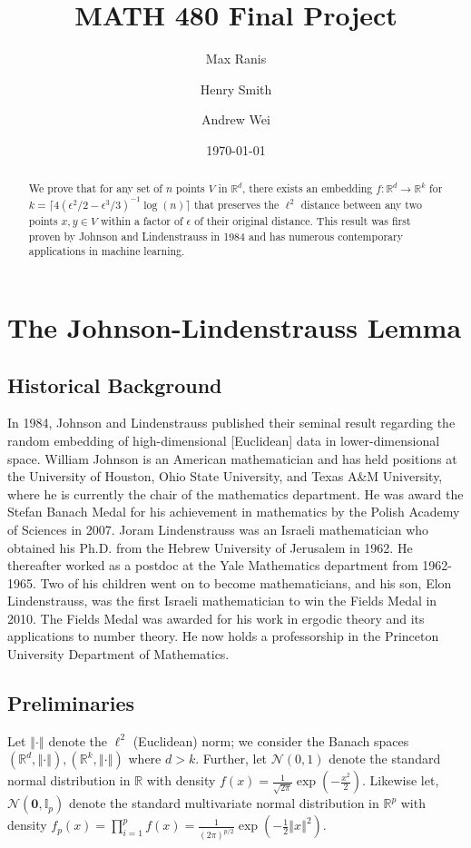 \documentclass{article}
\title{MATH 480 Final Project}
\author[]{Max Ranis}
\author[]{Henry Smith}
\author[]{Andrew Wei}
\affil[]{\normalsize Yale University}
\date{\today}
\begin{document}
\maketitle

\begin{abstract}
    \noindent We prove that for any set of $n$ points $V$ in $\mathbb{R}^d$, there exists an embedding $f: \mathbb{R}^d \rightarrow \mathbb{R}^k$ for $k = \lceil 4(\epsilon^2/2 - \epsilon^3/3)^{-1} \log(n) \rceil$ that preserves the $\ell^2$ distance between any two points $x, y \in V$ within a factor of $\epsilon$ of their original distance. This result was first proven by Johnson and Lindenstrauss in 1984 and has numerous contemporary applications in machine learning.
\end{abstract}


\pagebreak

\section{The Johnson-Lindenstrauss Lemma}

\subsection{Historical Background}
In 1984, Johnson and Lindenstrauss published their seminal result regarding the random embedding of high-dimensional [Euclidean] data in lower-dimensional space. William Johnson is an American mathematician and has held positions at the University of Houston, Ohio State University, and Texas A\&M University, where he is currently the chair of the mathematics department. He was award the Stefan Banach Medal for his achievement in mathematics by the Polish Academy of Sciences in 2007. Joram Lindenstrauss was an Israeli mathematician who obtained his Ph.D. from the Hebrew University of Jerusalem in 1962. He thereafter worked as a postdoc at the Yale Mathematics department from 1962-1965. Two of his children went on to become mathematicians, and his son, Elon Lindenstrauss, was the first Israeli mathematician to win the Fields Medal in 2010. The Fields Medal was awarded for his work in ergodic theory and its applications to number theory. He now holds a professorship in the Princeton University Department of Mathematics.

\subsection{Preliminaries}
Let $\left\Vert \cdot \right\Vert$ denote the $\ell^2$ (Euclidean) norm; we consider the Banach spaces $(\mathbb{R}^d, \left\Vert \cdot \right\Vert), (\mathbb{R}^k, \left\Vert \cdot \right\Vert)$ where $d > k$. Further, let $\mathcal{N}(0, 1)$ denote the standard normal distribution in $\mathbb{R}$ with density $f(x) = \frac{1}{\sqrt{2 \pi}} \exp \left(-\frac{x^2}{2} \right)$. Likewise let, $\mathcal{N}(\boldsymbol{0}, \mathbb{I}_p)$ denote the standard multivariate normal distribution in $\mathbb{R}^p$ with density $f_p(x) = \prod_{i=1}^p f(x) = \frac{1}{(2 \pi)^{p/2}} \exp \left(-\frac{1}{2} \left\Vert x \right\Vert^2 \right)$.
\end{document}
